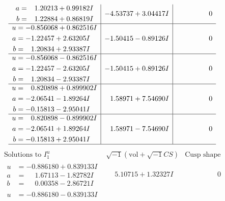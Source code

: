 \documentclass[1p]{elsarticle_modified}
\theoremstyle{definition}
\newcommand{\I}{\sqrt{-1}}
\begin{document}
$$\begin{array}{c|c|c}
\begin{aligned}
a &= \phantom{-}1.20213 + 0.99182 I \\
b &= \phantom{-}1.22884 + 0.86819 I\end{aligned}
 & -4.53737 + 3.04417 I & \phantom{-0.000000 } 0 \\ \hline\begin{aligned}
u &= -0.856068 + 0.862516 I \\
a &= -1.22457 + 2.63205 I \\
b &= \phantom{-}1.20834 + 2.93387 I\end{aligned}
 & -1.50415 - 0.89126 I & \phantom{-0.000000 } 0 \\ \hline\begin{aligned}
u &= -0.856068 - 0.862516 I \\
a &= -1.22457 - 2.63205 I \\
b &= \phantom{-}1.20834 - 2.93387 I\end{aligned}
 & -1.50415 + 0.89126 I & \phantom{-0.000000 } 0 \\ \hline\begin{aligned}
u &= \phantom{-}0.820898 + 0.899902 I \\
a &= -2.06541 - 1.89264 I \\
b &= -0.15813 - 2.95041 I\end{aligned}
 & \phantom{-}1.58971 + 7.54690 I & \phantom{-0.000000 } 0 \\ \hline\begin{aligned}
u &= \phantom{-}0.820898 - 0.899902 I \\
a &= -2.06541 + 1.89264 I \\
b &= -0.15813 + 2.95041 I\end{aligned}
 & \phantom{-}1.58971 - 7.54690 I & \phantom{-0.000000 } 0\\
 \hline 
 \end{array}$$\newpage$$\begin{array}{c|c|c}  
\text{Solutions to }I^u_{1}& \I (\text{vol} + \sqrt{-1}CS) & \text{Cusp shape}\\
 \hline 
\begin{aligned}
u &= -0.886180 + 0.839133 I \\
a &= \phantom{-}1.67113 - 1.82782 I \\
b &= \phantom{-}0.00358 - 2.86721 I\end{aligned}
 & \phantom{-}5.10715 + 1.32327 I & \phantom{-0.000000 } 0 \\ \hline\begin{aligned}
u &= -0.886180 - 0.839133 I \\

\end{aligned}
\end{array}$$
\end{document}

